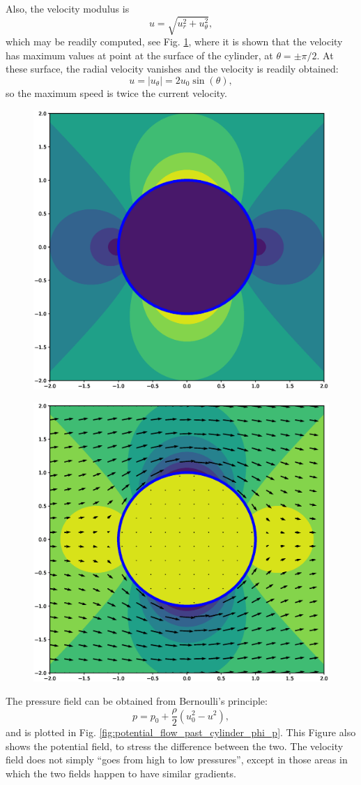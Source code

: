 Also, the velocity modulus is
\[
u = \sqrt{ u_r^2 + u_\theta^2}  ,
\]
which may be readily computed, see
Fig. \ref{fig:potential_flow_past_cylinder_vel}, where it is shown
that the velocity has maximum values at point at the surface of the
cylinder, at $\theta=\pm \pi/2$. At these surface, the radial velocity
vanishes and the velocity is readily obtained:
\[
u = |u_\theta| = 2 u_0  \sin(\theta) ,
\]
so the maximum speed is twice the current velocity.


\begin{figure}
  \centering
  \includegraphics[width=0.4\linewidth]{figures/potential_flow_past_cylinder_vel}
  \caption{\label{fig:potential_flow_past_cylinder_vel}}
\end{figure}


\begin{figure}
  \centering
  \includegraphics[width=0.4\linewidth]{figures/potential_flow_past_cylinder_vel_p}
  \caption{}%
\end{figure}


The pressure field can be obtained from Bernoulli's principle:
\[
p= p_0 +  \frac{\rho}2  \left(u_0^2 - u^2 \right) ,
\]
and is plotted in
Fig. \ref{fig:potential_flow_past_cylinder_phi_p}. This Figure also
shows the potential field, to stress the difference between the
two. The velocity field does not simply ``goes from high to low
pressures'', except in those areas in which the two fields happen to
have similar gradients.

